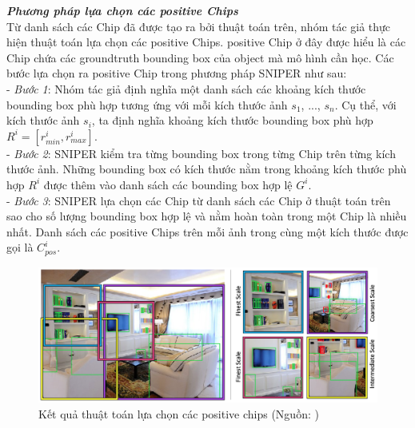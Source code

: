 {    \noindent
    \textbf{\textit{Phương pháp lựa chọn các positive Chips}} \\
    Từ danh sách các Chip đã được tạo ra bởi thuật toán trên, nhóm tác giả thực hiện thuật toán lựa chọn các positive Chips.
    positive Chip ở đây được hiểu là các Chip chứa các groundtruth  bounding box  của object mà mô hình cần học.
    Các bước lựa chọn ra positive Chip trong phương pháp SNIPER  như sau: \\
    - \textit{Bước 1}: Nhóm tác giả định nghĩa một danh sách các khoảng kích thước bounding box  phù hợp tương ứng với mỗi kích thước ảnh {${s}_{1}$, ..., ${s}_{n}$}.
    Cụ thể, với kích thước ảnh ${s}_{i}$, ta định nghĩa khoảng kích thước bounding box  phù hợp ${R}^{i} = [{r}_{min}^{i}, {r}_{max}^{i}]$. \\
    - \textit{Bước 2}: SNIPER  kiểm tra từng bounding box  trong từng Chip trên từng kích thước ảnh.
    Những bounding box  có kích thước nằm trong khoảng kích thước phù hợp ${R}^{i}$ được thêm vào danh sách các bounding box  hợp lệ ${G}^{i}$. \\
    - \textit{Bước 3}: SNIPER  lựa chọn các Chip từ danh sách các Chip ở thuật toán trên sao cho số lượng bounding box  hợp lệ và nằm hoàn toàn trong một Chip là nhiều nhất.
    Danh sách các positive Chips trên mỗi ảnh trong cùng một kích thước được gọi là ${C}_{pos}^{i}$.

    \begin{figure}[H]
        \centering
        \includegraphics[width=13cm] {images/sniper_pos_chip}
        \caption{Kết quả thuật toán lựa chọn các positive chips (Nguồn: \cite{singh2018sniper})}
        \label{fig:sniper_pos_chip}
    \end{figure}

}
